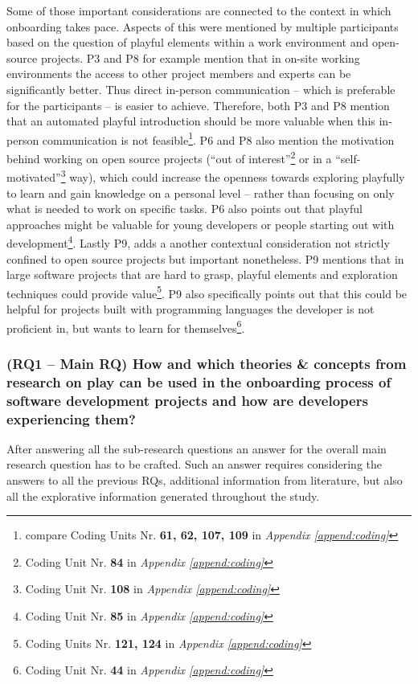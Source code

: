 Some of those important considerations are connected to the context in which onboarding takes pace. Aspects of this were mentioned by multiple participants based on the question of playful elements within a work environment and open-source projects. P3 and P8 for example mention that in on-site working environments the access to other project members and experts can be significantly better. Thus direct in-person communication -- which is preferable for the participants -- is easier to achieve. Therefore, both P3 and P8 mention that an automated playful introduction should be more valuable when this in-person communication is not feasible\footnote{compare Coding Units Nr. \textbf{61, 62, 107, 109} in \textit{Appendix \ref{append:coding}}}. P6 and P8 also mention the motivation behind working on open source projects (\enquote{out of interest}\footnote{Coding Unit Nr. \textbf{84} in \textit{Appendix \ref{append:coding}}} or in a \enquote{self-motivated}\footnote{Coding Unit Nr. \textbf{108} in \textit{Appendix \ref{append:coding}}} way), which could increase the openness towards exploring playfully to learn and gain knowledge on a personal level -- rather than focusing on only what is needed to work on specific tasks. P6 also points out that playful approaches might be valuable for young developers or people starting out with development\footnote{Coding Unit Nr. \textbf{85} in \textit{Appendix \ref{append:coding}}}. Lastly P9, adds a another contextual consideration not strictly confined to open source projects but important nonetheless. P9 mentions that in large software projects that are hard to grasp, playful elements and exploration techniques could provide value\footnote{Coding Units Nr. \textbf{121, 124} in \textit{Appendix \ref{append:coding}}}. P9 also specifically points out that this could be helpful for projects built with programming languages the developer is not proficient in, but wants to learn for themselves\footnote{Coding Unit Nr. \textbf{44} in \textit{Appendix \ref{append:coding}}}.

\subsubsection*{(RQ1 -- Main RQ) How and which theories \& concepts from research on play can be used in the onboarding process of software development projects and how are developers experiencing them?}

After answering all the sub-research questions an answer for the overall main research question has to be crafted. Such an answer requires considering the answers to all the previous RQs, additional information from literature, but also all the explorative information generated throughout the study.

